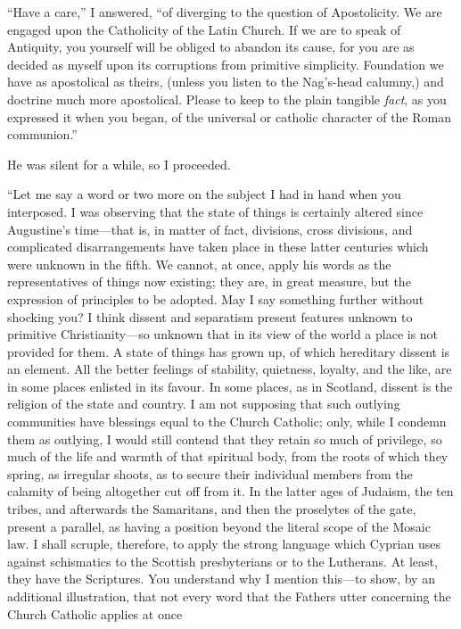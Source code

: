 ``Have a care,'' I answered, ``of diverging to the
question of Apostolicity. We are engaged upon the Catholicity of the
Latin Church. If we are to speak of Antiquity, you yourself will
be obliged to abandon its cause, for you are as decided as myself upon
its corruptions from primitive simplicity. Foundation we have as
apostolical as theirs, (unless you listen to the Nag's-head calumny,)
and doctrine much more apostolical. Please to keep to the plain
tangible \emph{fact}, as you expressed it when you began, of the
universal or catholic character of the Roman communion.''

He was silent for a while, so I proceeded.

``Let me say a word or two more on the subject I
had in hand when you interposed. I was observing that the state of
things is certainly altered since Augustine's time—that is, in
matter of fact, divisions, cross divisions, and complicated
disarrangements have taken place in these latter centuries which were
unknown in the fifth. We cannot, at once, apply his words as the
representatives of things now existing; they are, in great measure,
but the expression of principles to be adopted. May I say something
further without shocking you? I think dissent and separatism present
features unknown to primitive Christianity—so unknown that in its
view of the world a place is not provided for them. A state of things
has grown up, of which hereditary dissent is an element. All the
better feelings of stability, quietness, loyalty, and the like, are in
some places enlisted in its favour. In some places, as in Scotland,
dissent is the religion of the state and country. I am not supposing
that such outlying communities have blessings equal to the Church
Catholic; only, while I condemn them as outlying, I would still
contend that they retain so much of privilege, so much of the life and
warmth of that spiritual body, from the roots of which they spring, as
irregular shoots, as to secure their individual members from the
calamity of being altogether cut off from it. In the latter ages
of Judaism, the ten tribes, and afterwards the Samaritans, and then
the proselytes of the gate, present a parallel, as having a position
beyond the literal scope of the Mosaic law. I shall scruple,
therefore, to apply the strong language which Cyprian uses against
schismatics to the Scottish presbyterians or to the Lutherans. At
least, they have the Scriptures. You understand why I mention
this—to show, by an additional illustration, that not every word
that the Fathers utter concerning the Church Catholic applies at once
